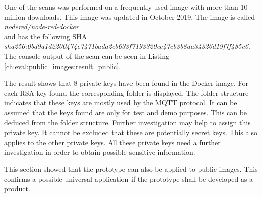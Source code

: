 One of the scans was performed on a frequently used image with more than 10 million downloads.
This image was updated in October 2019. 
The image is called \textit{nodered/node-red-docker} \\and has the following SHA \\\textit{sha256:0bd9a1d2200474e7471bada2eb633f7193320ee47cb3b8aa34326d19f7f485c6}.
\\The console output of the scan can be seen in Listing \ref{ch:eval:public_images:result_public}.

The result shows that 8 private keys have been found in the Docker image.
For each RSA key found the corresponding folder is displayed.
The folder structure indicates that these keys are mostly used by the MQTT protocol.
It can be assumed that the keys found are only for test and demo purposes. This can be deduced from the folder structure.
Further investigation may help to assign this private key. 
It cannot be excluded that these are potentially secret keys.
This also applies to the other private keys.
All these private keys need a further investigation in order to obtain possible sensitive information.

This section showed that the prototype can also be applied to public images.
This confirms a possible universal application if the prototype shall be developed as a product. 
